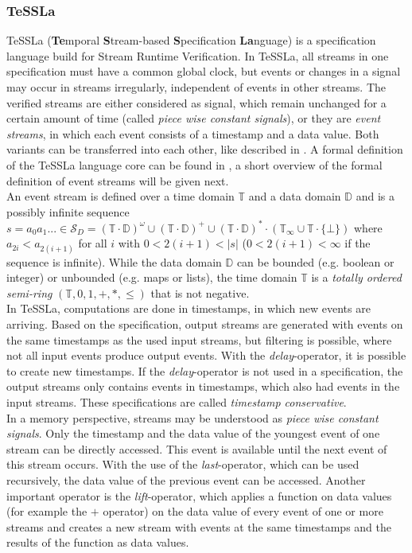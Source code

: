 	\subsubsection{TeSSLa}
		TeSSLa (\textbf{Te}mporal \textbf{S}tream-based \textbf{S}pecification \textbf{La}nguage) \cite{TeSSLa1} is a specification language build for Stream Runtime Verification. In TeSSLa, all streams in one specification must have a common global clock, but events or changes in a signal may occur in streams irregularly, independent of events in other streams. The verified streams are either considered as signal, which remain unchanged for a certain amount of time (called \textit{piece wise constant signals}), or they are \textit{event streams}, in which each event consists of a timestamp and a data value. Both variants can be transferred into each other, like described in \cite{TeSSLa1}. A formal definition of the TeSSLa language core can be found in \cite{TeSSLa2}, a short overview of the formal definition of event streams will be given next.\\
		An event stream is defined over a time domain $\mathbb{T}$ and a data domain $\mathbb{D}$ and is a possibly infinite sequence $s=a_0a_1...\in\mathcal{S}_D=(\mathbb{T}\cdot\mathbb{D})^\omega\cup(\mathbb{T}\cdot\mathbb{D})^+\cup(\mathbb{T}\cdot\mathbb{D})^*\cdot(\mathbb{T}_\infty\cup\mathbb{T}\cdot\{\bot\})$ where $a_{2i} < a_{2(i+1)}$ for all $i$ with $0 < 2(i + 1) < |s|$ ($0 < 2(i + 1) < \infty$ if the sequence is infinite). While the data domain $\mathbb{D}$ can be bounded (e.g. boolean or integer) or unbounded (e.g. maps or lists), the time domain $\mathbb{T}$ is a \emph{totally ordered semi-ring} $(\mathbb{T}, 0, 1, +, *, \leq)$ that is not negative.\\
		In TeSSLa, computations are done in timestamps, in which new events are arriving. Based on the specification, output streams are generated with events on the same timestamps as the used input streams, but filtering is possible, where not all input events produce output events. With the \textit{delay}-operator, it is possible to create new timestamps. If the \textit{delay}-operator is not used in a specification, the output streams only contains events in timestamps, which also had events in the input streams. These specifications are called \textit{timestamp conservative}.\\
		In a memory perspective, streams may be understood as \textit{piece wise constant signals}. Only the timestamp and the data value of the youngest event of one stream can be directly accessed. This event is available until the next event of this stream occurs. With the use of the \textit{last}-operator, which can be used recursively, the data value of the previous event can be accessed. Another important operator is the \textit{lift}-operator, which applies a function on data values (for example the $+$ operator) on the data value of every event of one or more streams and creates a new stream with events at the same timestamps and the results of the function as data values.
		
